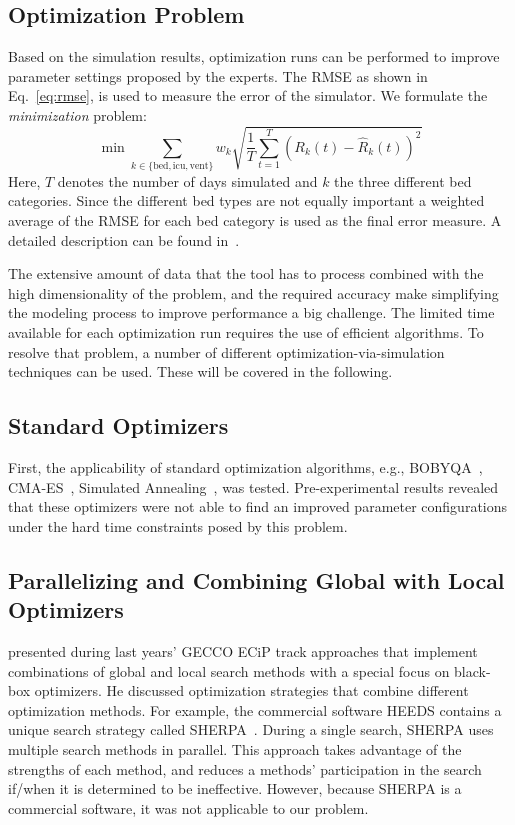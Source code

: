 \documentclass[conference]{IEEEtran}
\begin{document}
\subsection{Optimization Problem}
Based on the simulation results, optimization runs can be performed to improve parameter settings proposed by the experts. 
The \gls{RMSE} as shown in Eq.~\ref{eq:rmse}, is used to measure the error of the simulator.
We formulate the \emph{minimization} problem:
\begin{equation}\label{eq:rmse}
  \min 
  \sum_{k\in\{\text{bed},\text{icu},\text{vent}\}}
    w_k  \sqrt{\frac{1}{T} \sum_{t=1}^T \left(R_k(t) - \hat{R}_k(t)\right)^2}
\end{equation}
Here, $T$ denotes the number of days simulated and $k$ the three different bed categories.
Since the different bed types are not equally important a weighted average of the \gls{RMSE} for each bed category is used as the final error measure.
A detailed description can be found in~\cite{Anon21a}.

The extensive amount of data that the tool has to process combined with the high dimensionality of the problem, and the required accuracy make simplifying the modeling process to improve performance a big challenge.
The limited time available for each optimization run requires the use of efficient algorithms.
To resolve that problem, a number of different optimization-via-simulation techniques can be used. 
These will be covered in the following.

\subsection{Standard Optimizers}
First, the applicability of standard optimization algorithms, e.g., BOBYQA~\citep{Powe09a}, CMA-ES~\citep{Hans06a}, Simulated Annealing~\citep{vanL87a}, was tested. Pre-experimental results revealed that these optimizers were not able to find an improved parameter configurations under the hard time constraints posed by this problem. 

\subsection{Parallelizing and  Combining Global with Local Optimizers}\label{sec:comb}
\citet{Good18b} presented during last years' GECCO \gls{ECiP} track approaches that implement combinations of global and local search methods with a special focus on black-box optimizers.
He discussed optimization strategies that combine different optimization methods. 
For example, the commercial software HEEDS contains a unique search strategy called \gls{SHERPA}~\citep{Good08a}.
During a single search, \gls{SHERPA} uses multiple search methods in parallel.
This approach takes advantage of the strengths of each method, and reduces a methods’ participation in the search if/when it is determined to be ineffective.
However, because \gls{SHERPA} is a commercial software, it was not applicable to our problem.
\end{document}
